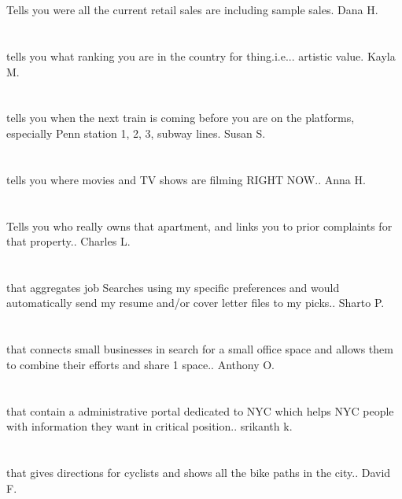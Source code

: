 \section{}Tells you were all the current retail sales are including sample sales. Dana H.
\section{}tells you what ranking you are in the country for thing.i.e... artistic value. Kayla M.
\section{}tells you when the next train is coming before you are on the platforms,  especially Penn station 1, 2, 3, subway lines. Susan S.
\section{}tells you where movies and TV shows are filming RIGHT NOW.. Anna H.
\section{}Tells you who really owns that apartment,  and links you to prior complaints for that property.. Charles L.
\section{}that aggregates job Searches using my specific preferences and would automatically send my resume and/or cover letter files to my picks.. Sharto P.
\section{}that connects small businesses in search for a small office space and allows them to combine their efforts and share 1 space.. Anthony O.
\section{}that contain a administrative portal dedicated to NYC which helps NYC people with information they want in critical position.. srikanth k.
\section{}that gives directions for cyclists and shows all the bike paths in the city.. David F.

